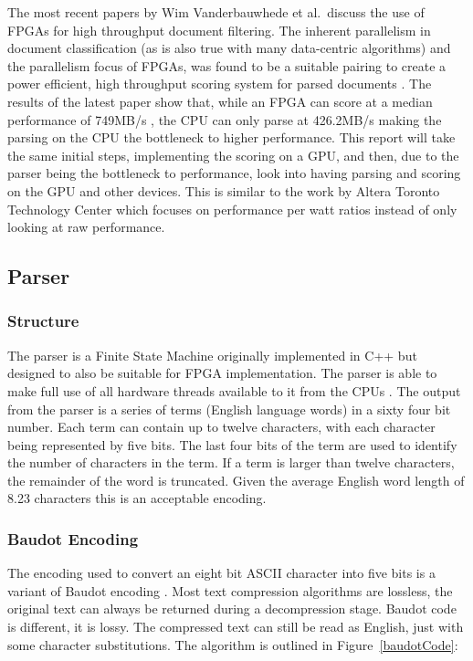 The most recent papers by Wim Vanderbauwhede et al.\ discuss the use of FPGAs
for high throughput document filtering. The inherent parallelism in document
classification (as is also true with many data-centric algorithms) and the
parallelism focus of FPGAs, was found to be a suitable pairing to create a power
efficient, high throughput scoring system for parsed documents
\cite{vanderbauwhede2013high} \cite{HybridCPUFPGA}. The results of the latest
paper show that, while an FPGA can score at a median performance of 749MB/s
\cite{vanderbauwhede2013high}, the CPU can only parse at 426.2MB/s making the
parsing on the CPU the bottleneck to higher performance. This report will take
the same initial steps, implementing the scoring on a GPU, and then, due to the
parser being the bottleneck to performance, look into having parsing and scoring
on the GPU and other devices. This is similar to the work by Altera Toronto
Technology Center which focuses on performance per watt ratios
\cite{chen2012invited} instead of only looking at raw performance.

\subsection{Parser}

\subsubsection{Structure}

The parser is a Finite State Machine originally implemented in C++ but designed
to also be suitable for FPGA implementation. The parser is able to make full use
of all hardware threads available to it from the CPUs \cite{HybridCPUFPGA}. The
output from the parser is a series of terms (English language words) in a sixty
four bit number. Each term can contain up to twelve characters, with each
character being represented by five bits. The last four bits of the term are
used to identify the number of characters in the term. If a term is larger than
twelve characters, the remainder of the word is truncated. Given the average
English word length of 8.23 characters \cite{englishWordLength} this is an
acceptable encoding.

\subsubsection{Baudot Encoding}

The encoding used to convert an eight bit ASCII character into five bits is a
variant of Baudot encoding \cite{baudotEncoding}. Most text
compression algorithms are lossless, the original text can always be returned
during a decompression stage. Baudot code is different, it is lossy. The
compressed text can still be read as English, just with some character
substitutions. The algorithm is outlined in Figure~\ref{baudotCode}:


